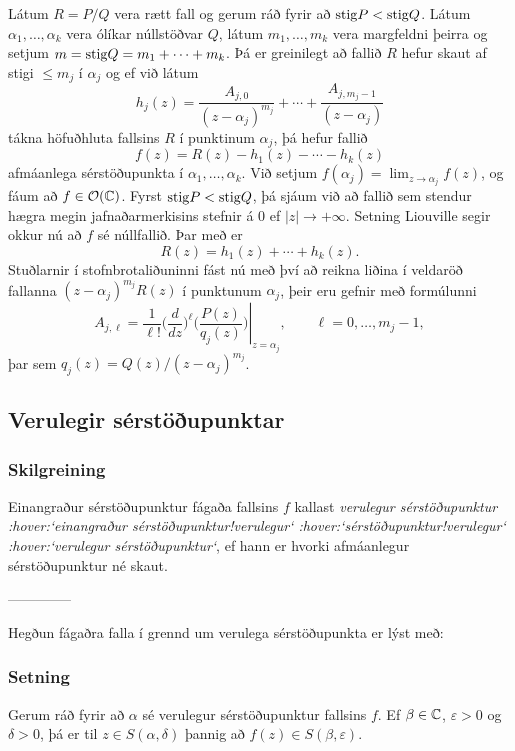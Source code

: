 Látum $R=P/Q$ vera rætt fall og gerum ráð fyrir að ${\operatorname{stig}} P<{\operatorname{stig}} Q$.
Látum $\alpha_1,\dots,\alpha_k$ vera ólíkar núllstöðvar $Q$, látum
$m_1,\dots,m_k$ vera margfeldni þeirra og setjum $m={\operatorname{stig}} Q=m_1+\cdots+m_k$.
Þá er greinilegt að fallið $R$ hefur skaut af stigi $\leq m_j$ í
$\alpha_j$ og ef við látum 
 $$h_j(z)=\dfrac{A_{j,0}}{(z-\alpha_j)^{m_j}}+\cdots+
\dfrac{A_{j,m_j-1}}{(z-\alpha_j)}
 $$
tákna höfuðhluta fallsins $R$ í punktinum $\alpha_j$, þá hefur fallið
 $$f(z)= R(z)-h_1(z)-\cdots-h_k(z)
 $$
afmáanlega sérstöðupunkta í $\alpha_1,\dots,\alpha_k$.  Við setjum
$f(\alpha_j)=\lim_{z\to \alpha_j}f(z)$, og fáum  að $f\in
{\cal O}({\mathbb C})$.  Fyrst ${\operatorname{stig}} P <{\operatorname{stig}} Q$, þá sjáum við að  fallið sem
stendur hægra megin jafnaðarmerkisins stefnir á $0$ ef $|z|\to
+\infty$.    Setning Liouville segir okkur nú að $f$ sé núllfallið.
Þar með er
 $$R(z)=h_1(z)+\cdots+h_k(z).
 $$
Stuðlarnir í stofnbrotaliðuninni fást nú með því að 
reikna liðina í veldaröð fallanna $(z-\alpha_j)^{m_j}R(z)$
í punktunum $\alpha_j$, þeir eru gefnir með formúlunni
$$ A_{j,\ell}=\left.\dfrac 1{\ell!}
\bigg(\dfrac {d}{dz}\bigg)^{\ell}\bigg(
\dfrac{P(z)}{q_j(z)}\bigg)\right|_{z=\alpha_j}, \qquad \ell=0,\dots,m_j-1,
$$
þar sem $q_j(z)=Q(z)/(z-\alpha_j)^{m_j}$.

\subsection*{Verulegir sérstöðupunktar}

\subsubsection{Skilgreining}
Einangraður sérstöðupunktur fágaða fallsins $f$ kallast {\it
verulegur sérstöðupunktur :hover:`einangraður
sérstöðupunktur!verulegur` :hover:`sérstöðupunktur!verulegur` :hover:`verulegur
sérstöðupunktur`}, 
ef hann er hvorki afmáanlegur sérstöðu\-punktur né skaut.  



--------------



Hegðun fágaðra falla í grennd um verulega sérstöðupunkta er lýst með:

\subsubsection{Setning}
Gerum ráð fyrir að $\alpha$ sé
verulegur sérstöðupunktur fallsins $f$.  Ef $\beta\in {\mathbb C}$,
$\varepsilon>0$ og $\delta>0$, þá er til $z\in S(\alpha,\delta)$
þannig að $f(z)\in S(\beta,\varepsilon)$.


